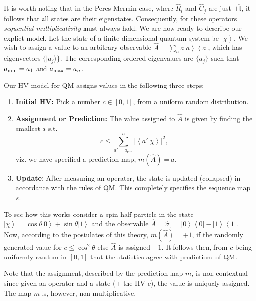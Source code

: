\documentclass[british,aps,prl,superscriptaddress,nofootinbib,times,reprint]{revtex4-1}
\theoremstyle{plain}
\theoremstyle{definition}
\theoremstyle{remark}
\theoremstyle{remark}
\theoremstyle{remark}
\theoremstyle{plain}
\theoremstyle{plain}
\theoremstyle{plain}
\theoremstyle{definition}
\theoremstyle{definition}
\begin{document}
It is worth noting that in the Peres Mermin
case, where $\hat{R}_{i}$ and $\hat{C}_{j}$ are
just $\pm\hat{\mathbb{I}}$, it follows that all
states are their eigenstates. Consequently, for
these operators \emph{sequential multiplicativity}
must always hold.
We are now ready to describe our explict model.
Let the state of a finite dimensional quantum system
be $\left|\chi\right\rangle $. We wish to
assign a value to an arbitrary observable 
$\hat{A}=\sum_{a}a\left|a\right\rangle
\left\langle a\right|$, which has 
eigenvectors $\{ \vert
a_j\rangle \}$. The corresponding ordered eigenvalues are $\{a_j\}$ such that 
$a_{\rm min}=a_1$
and 
$a_{\rm max}=a_n$.

Our HV model for QM assigns values in the following
three steps:
\setdefaultleftmargin{0pt}{}{}{}{}{}
\begin{enumerate}
\item
{\bf Initial HV:} Pick a number
$c\in[0,1]$, from a uniform random distribution.\
\item
{\bf
Assignment or Prediction:}
 The value assigned to
$\hat{A}$ is given by finding the smallest $a$
s.t.  \[
c\le\sum_{a'=a_{\text{min}}}^{a}\left|\left\langle
a'|\chi\right\rangle \right|^{2}, \] viz. we have
specified a prediction map, $m(\hat{A})=a$.
\item
{\bf Update:} After measuring an operator, the state is
updated (collapsed) in accordance with the rules
of QM. This completely specifies the sequence map
$s$.
\end{enumerate}
To see how this works consider 
a spin-half particle in the state
$\left|\chi\right\rangle
=\cos\theta\left|0\right\rangle
+\sin\theta\left|1\right\rangle $ and the observable
$\hat{A}=\hat{\sigma}_{z}=\left|0\right\rangle
\left\langle 0\right|-\left|1\right\rangle
\left\langle 1\right|$. Now, according to the
postulates of this theory, $m(\hat{A})=+1$, if
the randomly generated value for 
$c\le\cos^{2}\theta$ else $\hat{A}$ is assigned
$-1$. It follows then, from $c$ being uniformly
random in $[0,1]$ that the statistics agree with
predictions of QM.

Note that the assignment, described by the
prediction map $m$, is non-contextual since given
an operator and a state (+ the HV $c$), the value is
uniquely assigned. The map $m$ is, however,
non-multiplicative. 
\end{document}

